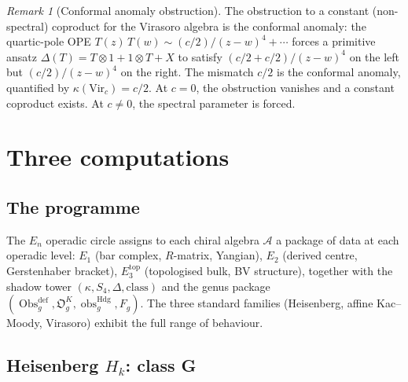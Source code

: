 \documentclass[11pt,reqno]{amsart}
\theoremstyle{definition}
\theoremstyle{remark}
\newtheorem{remark}[theorem]{Remark}
\providecommand{\cA}{\mathcal{A}}
\providecommand{\Eone}{E_1}
\providecommand{\Etwo}{E_2}
\providecommand{\Ethree}{E_3}
\providecommand{\En}{E_n}
\begin{document}
\begin{remark}[Conformal anomaly obstruction]
\label{rem:e-conformal-anomaly}
The obstruction to a constant (non-spectral) coproduct for the
Virasoro algebra is the conformal anomaly: the quartic-pole
OPE $T(z)\,T(w) \sim (c/2)/(z-w)^4 + \cdots$ forces
a primitive ansatz
$\Delta(T) = T \otimes 1 + 1 \otimes T + X$ to satisfy
$(c/2 + c/2)/(z-w)^4$ on the left but $(c/2)/(z-w)^4$ on
the right. The mismatch $c/2$ is the conformal anomaly,
quantified by $\kappa(\mathrm{Vir}_c) = c/2$. At $c = 0$,
the obstruction vanishes and a constant coproduct exists.
At $c \neq 0$, the spectral parameter is forced.
\end{remark}


\section{Three computations}
\label{sec:computations}

\subsection{The programme}

The $\En$ operadic circle assigns to each chiral algebra
$\cA$ a package of data at each operadic level:
$\Eone$ (bar complex, $R$-matrix, Yangian),
$\Etwo$ (derived centre, Gerstenhaber bracket),
$\Ethree^{\mathrm{top}}$ (topologised bulk, BV structure),
together with the shadow tower
$(\kappa, S_4, \Delta, \mathrm{class})$ and the genus package
$(\operatorname{Obs}^{\mathrm{def}}_g,\mathfrak O_g^K,
\operatorname{obs}^{\mathrm{Hdg}}_g,F_g)$. The three standard families
(Heisenberg, affine Kac--Moody, Virasoro) exhibit the
full range of behaviour.

\subsection{Heisenberg $H_k$: class G}
\end{document}
